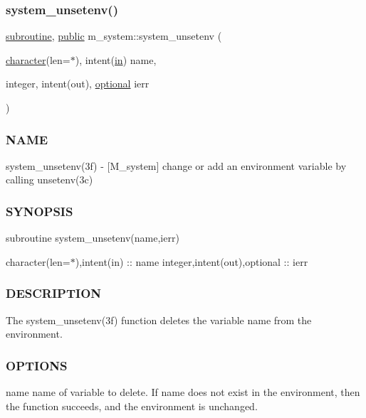 \subsubsection{\texorpdfstring{system\+\_\+unsetenv()}{system\_unsetenv()}}
{\footnotesize\ttfamily \hyperlink{M__stopwatch_83_8txt_acfbcff50169d691ff02d4a123ed70482}{subroutine}, \hyperlink{M__stopwatch_83_8txt_a2f74811300c361e53b430611a7d1769f}{public} m\+\_\+system\+::system\+\_\+unsetenv (\begin{DoxyParamCaption}\item[{\hyperlink{option__stopwatch_83_8txt_abd4b21fbbd175834027b5224bfe97e66}{character}(len=$\ast$), intent(\hyperlink{M__journal_83_8txt_afce72651d1eed785a2132bee863b2f38}{in})}]{name,  }\item[{integer, intent(out), \hyperlink{option__stopwatch_83_8txt_aa4ece75e7acf58a4843f70fe18c3ade5}{optional}}]{ierr }\end{DoxyParamCaption})}



\subsubsection*{N\+A\+ME}

system\+\_\+unsetenv(3f) -\/ \mbox{[}M\+\_\+system\mbox{]} change or add an environment variable by calling unsetenv(3c) \subsubsection*{S\+Y\+N\+O\+P\+S\+IS}

subroutine system\+\_\+unsetenv(name,ierr)

character(len=$\ast$),intent(in) \+:\+: name integer,intent(out),optional \+:\+: ierr

\subsubsection*{D\+E\+S\+C\+R\+I\+P\+T\+I\+ON}

\begin{DoxyVerb}The system_unsetenv(3f) function deletes the variable name from the
environment.
\end{DoxyVerb}


\subsubsection*{O\+P\+T\+I\+O\+NS}

name name of variable to delete. If name does not exist in the environment, then the function succeeds, and the environment is unchanged.

